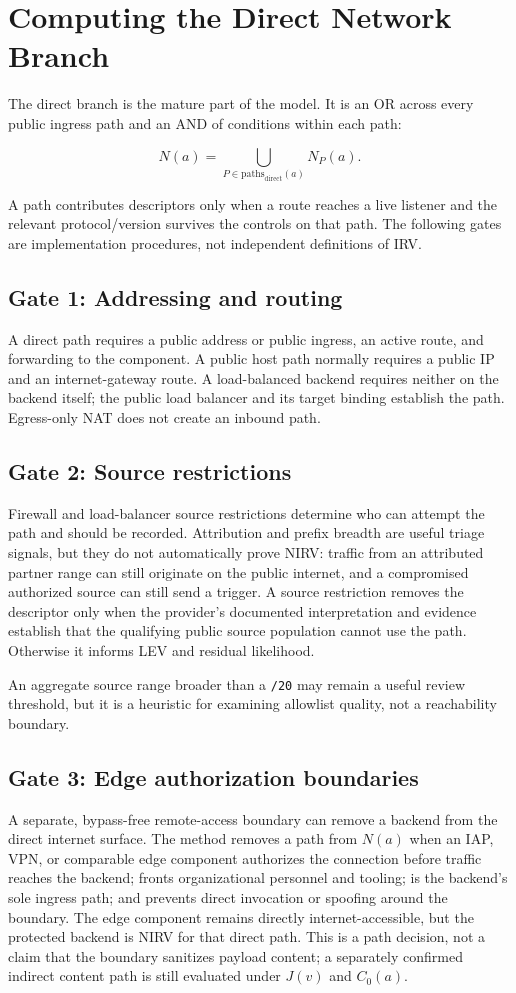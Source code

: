 \documentclass[11pt]{article}
\newcommand{\code}[1]{\texttt{#1}}
\begin{document}
\section{Computing the Direct Network Branch}
\label{sec:direct}
The direct branch is the mature part of the model. It is an OR across every
public ingress path and an AND of conditions within each path:

\[
N(a)=\bigcup_{P\in\mathrm{paths}_{\mathrm{direct}}(a)}N_P(a).
\]

A path contributes descriptors only when a route reaches a live listener and
the relevant protocol/version survives the controls on that path. The
following gates are implementation procedures, not independent definitions of
IRV.

\subsection{Gate 1: Addressing and routing}
A direct path requires a public address or public ingress, an active route,
and forwarding to the component. A public host path normally requires a public
IP and an internet-gateway route. A load-balanced backend requires neither on
the backend itself; the public load balancer and its target binding establish
the path. Egress-only NAT does not create an inbound path.

\subsection{Gate 2: Source restrictions}
Firewall and load-balancer source restrictions determine who can attempt the
path and should be recorded. Attribution and prefix breadth are useful triage
signals, but they do not automatically prove NIRV: traffic from an attributed
partner range can still originate on the public internet, and a compromised
authorized source can still send a trigger. A source restriction removes the
descriptor only when the provider's documented interpretation and evidence
establish that the qualifying public source population cannot use the path.
Otherwise it informs LEV and residual likelihood.

An aggregate source range broader than a \code{/20} may remain a useful review
threshold, but it is a heuristic for examining allowlist quality, not a
reachability boundary.

\subsection{Gate 3: Edge authorization boundaries}
A separate, bypass-free remote-access boundary can remove a backend from the
direct internet surface. The method removes a path from $N(a)$ when an IAP,
VPN, or comparable edge component authorizes the connection before traffic
reaches the backend; fronts organizational personnel and tooling; is the
backend's sole ingress path; and prevents direct invocation or spoofing around
the boundary. The edge component remains directly internet-accessible, but the
protected backend is NIRV for that direct path. This is a path decision, not a
claim that the boundary sanitizes payload content; a separately confirmed
indirect content path is still evaluated under $J(v)$ and $C_0(a)$.
\end{document}
